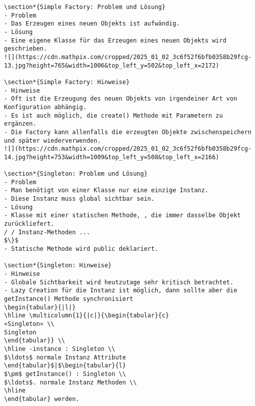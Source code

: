 \documentclass[10pt]{article}
\begin{document}
\begin{verbatim}
\section*{Simple Factory: Problem und Lösung}
- Problem
- Das Erzeugen eines neuen Objekts ist aufwändig.
- Lösung
- Eine eigene Klasse für das Erzeugen eines neuen Objekts wird geschrieben.
![](https://cdn.mathpix.com/cropped/2025_01_02_3c6f52f6bfb0358b29fcg-13.jpg?height=765&width=1006&top_left_y=502&top_left_x=2172)

\section*{Simple Factory: Hinweise}
- Hinweise
- Oft ist die Erzeugung des neuen Objekts von irgendeiner Art von Konfiguration abhängig.
- Es ist auch möglich, die create() Methode mit Parametern zu ergänzen.
- Die Factory kann allenfalls die erzeugten Objekte zwischenspeichern und später wiederverwenden.
![](https://cdn.mathpix.com/cropped/2025_01_02_3c6f52f6bfb0358b29fcg-14.jpg?height=753&width=1009&top_left_y=508&top_left_x=2166)

\section*{Singleton: Problem und Lösung}
- Problem
- Man benötigt von einer Klasse nur eine einzige Instanz.
- Diese Instanz muss global sichtbar sein.
- Lösung
- Klasse mit einer statischen Methode, , die immer dasselbe Objekt zurückliefert.
/ / Instanz-Methoden ...
$\}$
- Statische Methode wird public deklariert.

\section*{Singleton: Hinweise}
- Hinweise
- Globale Sichtbarkeit wird heutzutage sehr kritisch betrachtet.
- Lazy Creation für die Instanz ist möglich, dann sollte aber die getInstance() Methode synchronisiert
\begin{tabular}{|l|}
\hline \multicolumn{1}{|c|}{\begin{tabular}{c} 
«Singleton» \\
Singleton
\end{tabular}} \\
\hline -instance : Singleton \\
$\ldots$ normale Instanz Attribute
\end{tabular}$|$\begin{tabular}{l}
$\pm$ getInstance() : Singleton \\
$\ldots$. normale Instanz Methoden \\
\hline
\end{tabular} werden.


\end{verbatim}
\end{document}
